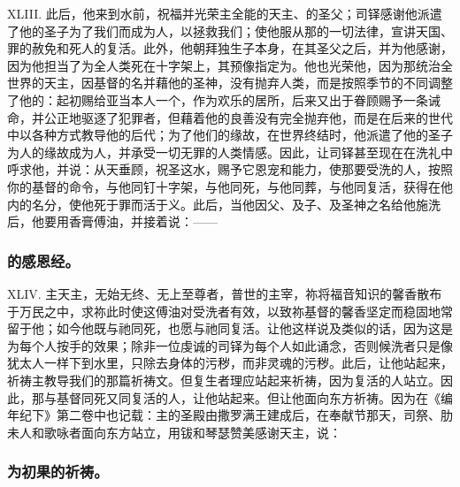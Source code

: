 XLIII. 此后，他来到水前，祝福并光荣主全能的天主、的圣父；司铎感谢他派遣了他的圣子为了我们而成为人，以拯救我们；使他服从那的一切法律，宣讲天国、罪的赦免和死人的复活。此外，他朝拜独生子本身，在其圣父之后，并为他感谢，因为他担当了为全人类死在十字架上，其预像指定为。他也光荣他，因为那统治全世界的天主，因基督的名并藉他的圣神，没有抛弃人类，而是按照季节的不同调整了他的：起初赐给亚当本人一个，作为欢乐的居所，后来又出于眷顾赐予一条诫命，并公正地驱逐了犯罪者，但藉着他的良善没有完全抛弃他，而是在后来的世代中以各种方式教导他的后代；为了他们的缘故，在世界终结时，他派遣了他的圣子为人的缘故成为人，并承受一切无罪的人类情感。因此，让司铎甚至现在在洗礼中呼求他，并说：从天垂顾，祝圣这水，赐予它恩宠和能力，使那要受洗的人，按照你的基督的命令，与他同钉十字架，与他同死，与他同葬，与他同复活，获得在他内的名分，使他死于罪而活于义。此后，当他因父、及子、及圣神之名给他施洗后，他要用香膏傅油，并接着说：——\par


\subsubsection{的感恩经。}

XLIV. 主天主，无始无终、无上至尊者，普世的主宰，祢将福音知识的馨香散布于万民之中，求祢此时使这傅油对受洗者有效，以致祢基督的馨香坚定而稳固地常留于他；如今他既与祂同死，也愿与祂同复活。让他这样说及类似的话，因为这是为每个人按手的效果；除非一位虔诚的司铎为每个人如此诵念，否则候洗者只是像犹太人一样下到水里，只除去身体的污秽，而非灵魂的污秽。此后，让他站起来，祈祷主教导我们的那篇祈祷文。但复生者理应站起来祈祷，因为复活的人站立。因此，那与基督同死又同复活的人，让他站起来。但让他面向东方祈祷。因为在《编年纪下》第二卷中也记载：主的圣殿由撒罗满王建成后，在奉献节那天，司祭、肋未人和歌咏者面向东方站立，用钹和琴瑟赞美感谢天主，说： \par


\subsubsection{为初果的祈祷。}

